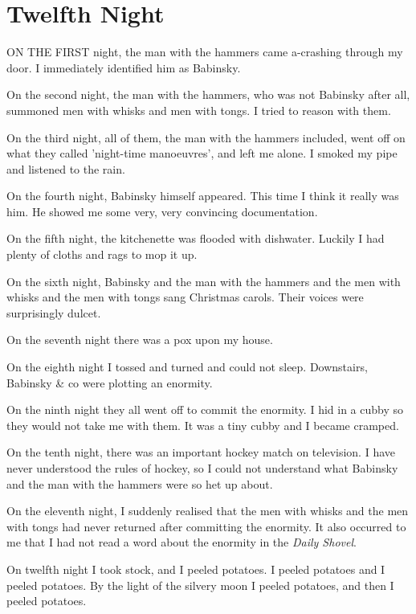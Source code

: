 \chapter{Twelfth Night}

ON THE FIRST night, the man with the hammers came a-crashing through my door. I immediately identified him as Babinsky.

On the second night, the man with the hammers, who was not Babinsky after all, summoned men with whisks and men with tongs. I tried to reason with them.

On the third night, all of them, the man with the hammers included, went off on what they called 'night-time manoeuvres', and left me alone. I smoked my pipe and listened to the rain.

On the fourth night, Babinsky himself appeared. This time I think it really was him. He showed me some very, very convincing documentation.

On the fifth night, the kitchenette was flooded with dishwater. Luckily I had plenty of cloths and rags to mop it up.

On the sixth night, Babinsky and the man with the hammers and the men with whisks and the men with tongs sang Christmas carols. Their voices were surprisingly dulcet.

On the seventh night there was a pox upon my house.

On the eighth night I tossed and turned and could not sleep. Downstairs, Babinsky \& co were plotting an enormity.

On the ninth night they all went off to commit the enormity. I hid in a cubby so they would not take me with them. It was a tiny cubby and I became cramped.

On the tenth night, there was an important hockey match on television. I have never understood the rules of hockey, so I could not understand what Babinsky and the man with the hammers were so het up about.

On the eleventh night, I suddenly realised that the men with whisks and the men with tongs had never returned after committing the enormity. It also occurred to me that I had not read a word about the enormity in the \emph{Daily Shovel}.

On twelfth night I took stock, and I peeled potatoes. I peeled potatoes and I peeled potatoes. By the light of the silvery moon I peeled potatoes, and then I peeled potatoes.